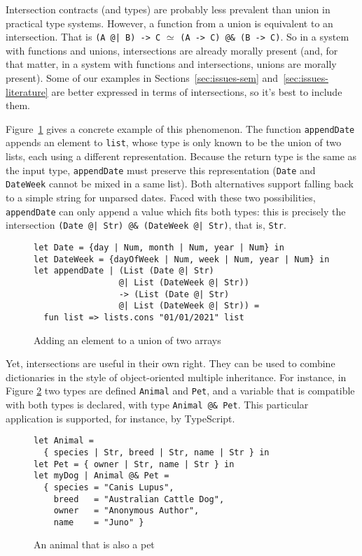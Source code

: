 \documentclass[sigplan,screen,10pt]{acmart}
\newcommand{\nickel}[1]{\lstinline[language=nickel]{#1}}
\begin{document}
Intersection contracts (and types) are probably less prevalent than union in
practical type systems. However, a function from a union is equivalent to an
intersection. That is \nickel{(A @| B) -> C} $\simeq$ \nickel{(A -> C) @& (B ->
C)}. So in a system with functions and unions, intersections are already morally
present (and, for that matter, in a system with functions and intersections,
unions are morally present). Some of our examples in
Sections~\ref{sec:issues-sem} and~\ref{sec:issues-literature} are better
expressed in terms of intersections, so it's best to include them.

Figure~\ref{fig:addElem} gives a concrete example of this phenomenon. The
function \nickel{appendDate} appends an element to \nickel{list}, whose type is
only known to be the union of two lists, each using a different representation.
Because the return type is the same as the input type, \nickel{appendDate} must
preserve this representation (\nickel{Date} and \nickel{DateWeek}
cannot be mixed in a same list).  Both alternatives support falling back to
a simple string for unparsed dates.  Faced with these two possibilities,
\nickel{appendDate} can only append a value which fits both types: this is
precisely the intersection \nickel{(Date @| Str) @& (DateWeek @| Str)}, that
is, \nickel{Str}.

\begin{figure}[h]
\begin{lstlisting}[language=Nickel]
let Date = {day | Num, month | Num, year | Num} in
let DateWeek = {dayOfWeek | Num, week | Num, year | Num} in
let appendDate | (List (Date @| Str)
                 @| List (DateWeek @| Str))
                 -> (List (Date @| Str)
                 @| List (DateWeek @| Str)) =
  fun list => lists.cons "01/01/2021" list
\end{lstlisting}
\caption{Adding an element to a union of two arrays}
\label{fig:addElem}
\end{figure}

Yet, intersections are useful in their own right. They can be used to
combine dictionaries in the style of object-oriented multiple inheritance. For instance, in
Figure \ref{fig:intersection-record} two types are defined
\nickel{Animal} and \nickel{Pet}, and a variable that is compatible
with both types is declared, with type \nickel{Animal @& Pet}. This
particular application is supported, for instance, by TypeScript.

\begin{figure}[h]
\begin{lstlisting}[language=nickel]
let Animal =
  { species | Str, breed | Str, name | Str } in
let Pet = { owner | Str, name | Str } in
let myDog | Animal @& Pet =
  { species = "Canis Lupus",
    breed   = "Australian Cattle Dog",
    owner   = "Anonymous Author",
    name    = "Juno" }
\end{lstlisting}
\caption{An animal that is also a pet}
\label{fig:intersection-record}
\end{figure}
\end{document}
